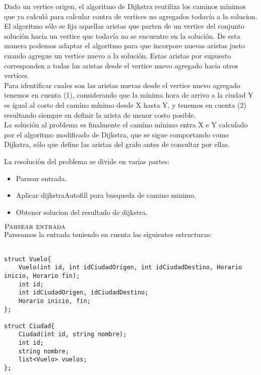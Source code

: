 \noindent
Dado un vertice origen, el algoritmo de Dijkstra reutiliza los caminos m\'inimos que ya calcul\'o para calcular contra de vertices no agregados todav\'ia a la solucion. El algoritmo s\'olo se fija aquellas aristas que parten de un vertice del conjunto soluci\'on hacia un vertice que todav\'ia no se encuentre en la soluci\'on. De esta manera podemos adaptar el algoritmo para que incorpore nuevas aristas justo cuando agregue un vertice nuevo a la soluci\'on. Estas aristas por supuesto corresponden a todas las aristas desde el vertice nuevo agregado hacia otros vertices. \\
Para identificar cuales son las aristas nuevas desde el vertice nuevo agregado tenemos en cuenta (1), considerando que la m\'inima hora de arrivo a la ciudad Y es igual al costo del cam\'ino m\'inimo desde X hasta Y, y tenemos en cuenta (2) resultando siempre en definir la arista de menor costo posible.\\

\noindent
La soluci\'on al problema es finalmente el camino m\'inimo entra X e Y calculado por el algoritmo modificado de Dijkstra, que se sigue comportando como Dijkstra, s\'olo que define las aristas del grafo antes de consultar por ellas. \\
\bigskip
\bigskip

\noindent
La resoluci\'on del problema se divide en varias partes:

\begin{itemize}
\item Parsear entrada.
\item Aplicar dijkstraAutofill para busqueda de camino minimo.
\item Obtener solucion del resultado de dijkstra.
\end{itemize}

\noindent
$\textnormal{\scshape Parsear entrada}$ \\

Parseamos la entrada teniendo en cuenta las siguientes estructuras:

\begin{lstlisting}

struct Vuelo{
	Vuelo(int id, int idCiudadOrigen, int idCiudadDestino, Horario inicio, Horario fin);
	int id;
	int idCiudadOrigen, idCiudadDestino;
	Horario inicio, fin;
};

struct Ciudad{
	Ciudad(int id, string nombre);
	int id;
	string nombre;
	list<Vuelo> vuelos;
};

\end{lstlisting}
\bigskip

